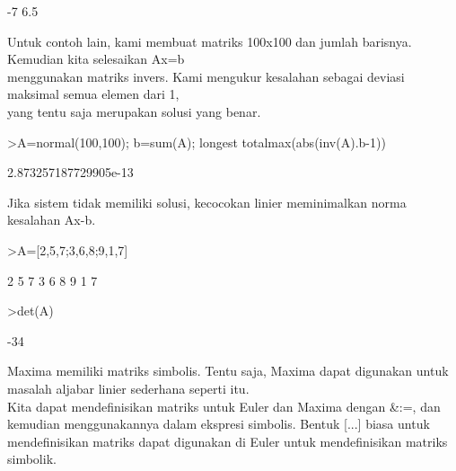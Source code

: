\documentclass[a4paper,10pt]{article}
\begin{document}
\begin{eulernotebook}
\begin{eulercomment}
\begin{eulercomment}
\begin{eulercomment}
\begin{eulercomment}
\begin{eulerprompt}
\end{eulerprompt}
\begin{euleroutput}
             -7 
            6.5 
\end{euleroutput}
\begin{eulercomment}
Untuk contoh lain, kami membuat matriks 100x100 dan jumlah barisnya.
Kemudian kita selesaikan Ax=b\\
menggunakan matriks invers. Kami mengukur kesalahan sebagai deviasi
maksimal semua elemen dari 1,\\
yang tentu saja merupakan solusi yang benar.
\end{eulercomment}
\begin{eulerprompt}
>A=normal(100,100); b=sum(A); longest totalmax(abs(inv(A).b-1))
\end{eulerprompt}
\begin{euleroutput}
    2.873257187729905e-13 
\end{euleroutput}
\begin{eulercomment}
Jika sistem tidak memiliki solusi, kecocokan linier meminimalkan norma\\
kesalahan Ax-b.
\end{eulercomment}
\begin{eulerprompt}
>A=[2,5,7;3,6,8;9,1,7]
\end{eulerprompt}
\begin{euleroutput}
              2             5             7 
              3             6             8 
              9             1             7 
\end{euleroutput}
\begin{eulerprompt}
>det(A)
\end{eulerprompt}
\begin{euleroutput}
  -34
\end{euleroutput}
\begin{eulercomment}
Maxima memiliki matriks simbolis. Tentu saja, Maxima dapat digunakan
untuk masalah aljabar linier sederhana seperti itu.\\
Kita dapat mendefinisikan matriks untuk Euler dan Maxima dengan \&:=,
dan kemudian menggunakannya dalam ekspresi simbolis. Bentuk [...]
biasa untuk mendefinisikan matriks dapat digunakan di Euler untuk
mendefinisikan matriks simbolik.
\end{eulercomment}
\begin{eulerformula}

\end{eulerformula}
\end{eulercomment}
\end{eulercomment}
\end{eulercomment}
\end{eulercomment}
\end{eulernotebook}
\end{document}
